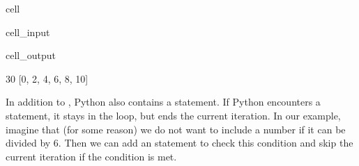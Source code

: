 \documentclass[letterpaper,10pt,english]{jupyterBook}
\begin{document}
\begin{sphinxuseclass}{cell}\begin{sphinxVerbatimInput}

\begin{sphinxuseclass}{cell_input}
\begin{sphinxVerbatim}[commandchars=\\\{\}]
  
  
  \PYG{p}{[}\PYG{p}{]}

   
          
                      
                      
          
           
\end{sphinxVerbatim}

\end{sphinxuseclass}\end{sphinxVerbatimInput}
\begin{sphinxVerbatimOutput}

\begin{sphinxuseclass}{cell_output}
\begin{sphinxVerbatim}[commandchars=\\\{\}]
30
[0, 2, 4, 6, 8, 10]
\end{sphinxVerbatim}

\end{sphinxuseclass}\end{sphinxVerbatimOutput}

\end{sphinxuseclass}
\sphinxAtStartPar
In addition to , Python also contains a  statement. If Python encounters a  statement, it stays in the loop, but ends the current iteration. In our example, imagine that (for some reason) we do not want to include a number  if it can be divided by 6. Then we can add an  statement to check this condition and skip the current iteration if the condition is met.
\end{document}
